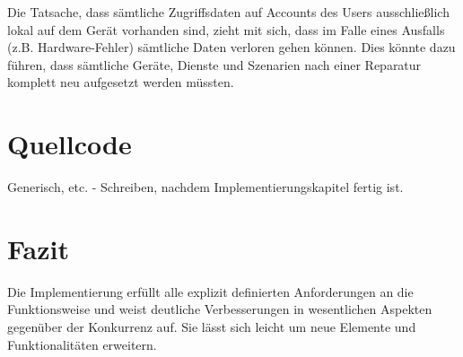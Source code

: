 Die Tatsache, dass sämtliche Zugriffsdaten auf Accounts des Users ausschließlich lokal auf dem Gerät vorhanden sind, zieht mit sich, dass im Falle eines Ausfalls (z.B. Hardware-Fehler) sämtliche Daten verloren gehen können. Dies könnte dazu führen, dass sämtliche Geräte, Dienste und Szenarien nach einer Reparatur komplett neu aufgesetzt werden müssten.



\section{Quellcode}
Generisch, etc. - Schreiben, nachdem Implementierungskapitel fertig ist.


\section{Fazit}
Die Implementierung erfüllt alle explizit definierten Anforderungen an die Funktionsweise und weist deutliche Verbesserungen in wesentlichen Aspekten gegenüber der Konkurrenz auf. Sie lässt sich leicht um neue Elemente und Funktionalitäten erweitern.